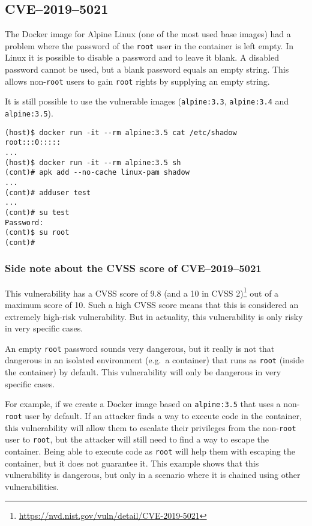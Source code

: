 \subsection{CVE--2019--5021}\label{subsection:CVE-2019-5021}
The Docker image for Alpine Linux (one of the most used base images) had a problem where the password of the \lstinline{root} user in the container is left empty. In Linux it is possible to disable a password and to leave it blank. A disabled password cannot be used, but a blank password equals an empty string. This allows non-\lstinline{root} users to gain \lstinline{root} rights by supplying an empty string.

\hfill

It is still possible to use the vulnerable images (\lstinline{alpine:3.3}, \lstinline{alpine:3.4} and \lstinline{alpine:3.5}).
\begin{lstlisting}[caption={The Docker image of Alpine Linux 3.5 has an empty password.},captionpos=b]
(host)$ docker run -it --rm alpine:3.5 cat /etc/shadow
root:::0:::::
...
(host)$ docker run -it --rm alpine:3.5 sh
(cont)# apk add --no-cache linux-pam shadow
...
(cont)# adduser test
...
(cont)# su test
Password:
(cont)$ su root
(cont)#
\end{lstlisting}

\subsubsection*{Side note about the CVSS score of CVE--2019--5021}

This vulnerability has a CVSS score of 9.8 (and a 10 in CVSS 2)\footnote{\url{https://nvd.nist.gov/vuln/detail/CVE-2019-5021}} out of a maximum score of 10. Such a high CVSS score means that this is considered an extremely high-risk vulnerability. But in actuality, this vulnerability is only risky in very specific cases.

An empty \lstinline{root} password sounds very dangerous, but it really is not that dangerous in an isolated environment (e.g.\ a container) that runs as \lstinline{root} (inside the container) by default. This vulnerability will only be dangerous in very specific cases.

For example, if we create a Docker image based on \lstinline{alpine:3.5} that uses a non-\lstinline{root} user by default. If an attacker finds a way to execute code in the container, this vulnerability will allow them to escalate their privileges from the non-\lstinline{root} user to \lstinline{root}, but the attacker will still need to find a way to escape the container. Being able to execute code as \lstinline{root} will help them with escaping the container, but it does not guarantee it. This example shows that this vulnerability is dangerous, but only in a scenario where it is chained using other vulnerabilities.
